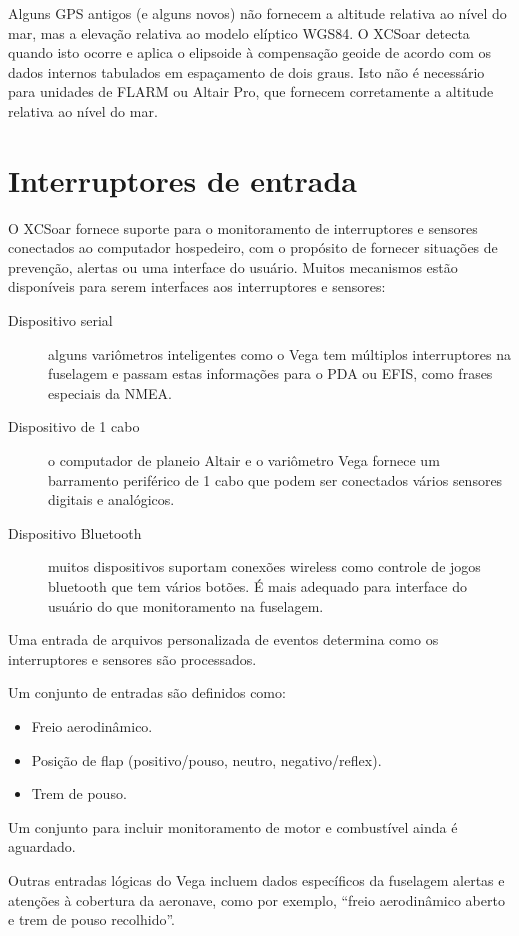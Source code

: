 Alguns GPS antigos (e alguns novos) não fornecem a altitude relativa ao nível do mar, mas a elevação relativa ao modelo elíptico WGS84.  O XCSoar detecta quando isto ocorre e aplica o elipsoide à compensação geoide de acordo com os dados internos tabulados em espaçamento de dois graus.  Isto não é necessário para unidades de FLARM ou Altair Pro, que fornecem corretamente a altitude relativa ao nível do mar.

\section{Interruptores de entrada}

O XCSoar fornece suporte para o monitoramento de interruptores e sensores conectados ao computador hospedeiro, com o propósito de fornecer situações de prevenção, alertas ou uma interface do usuário.  Muitos mecanismos estão disponíveis para serem interfaces aos interruptores e sensores:
\begin{description}
\item[Dispositivo serial]  alguns variômetros inteligentes como o Vega tem múltiplos interruptores na fuselagem e passam estas informações para o PDA ou EFIS, como frases especiais da NMEA.
\item[Dispositivo de 1 cabo]  o computador de planeio Altair e o variômetro Vega fornece um barramento periférico de 1 cabo que podem ser conectados vários sensores digitais e analógicos.
\item[Dispositivo Bluetooth]  muitos dispositivos suportam conexões wireless como controle de jogos bluetooth que tem vários botões.  É mais adequado para interface do usuário do que monitoramento na fuselagem.
\end{description}

Uma entrada de arquivos personalizada de eventos determina como os interruptores e sensores são processados.

Um conjunto de entradas são definidos como:

\begin{itemize}
\item Freio aerodinâmico.
\item Posição de flap (positivo/pouso, neutro, negativo/reflex).
\item Trem de pouso.
\end{itemize}

Um conjunto para incluir monitoramento de motor e combustível ainda é aguardado.

Outras entradas lógicas do Vega incluem dados específicos da fuselagem alertas e atenções à cobertura da aeronave, como por exemplo, “freio aerodinâmico aberto e trem de pouso recolhido”.

